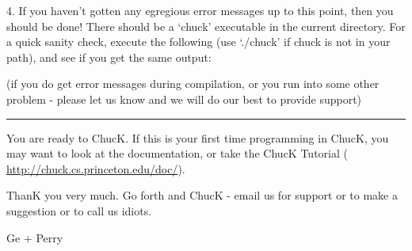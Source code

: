 
4. If you haven't gotten any egregious error messages up to this point, 
then you should be done! There should be a `chuck' executable in the 
current directory. For a quick sanity check, execute the following (use 
`./chuck' if chuck is not in your path), and see if you get the same output:


(if you do get error messages during compilation, or you run into some 
other problem - please let us know and we will do our best to provide 
support) 

\rule{1in}{.5pt}

You are ready to ChucK. If this is your first time programming in 
ChucK, you may want to look at the documentation, or take the ChucK 
Tutorial ( \href{http://chuck.cs.princeton.edu/doc}{http://chuck.cs.princeton.edu/doc/}). 

ThanK you very much. Go forth and ChucK - email us for support or to make a 
suggestion or to call us idiots.

Ge + Perry
 
